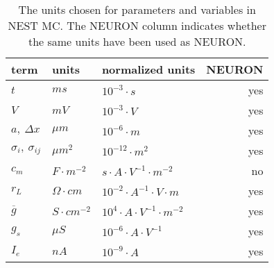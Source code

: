 \begin{table}[hp!]
\begin{tabular}{lllr}
    \hline
    term                      &   units                 &  normalized units                         & NEURON \\
    \hline
    $t$                       &   $ms$                  &  $10^{-3} \cdot s$                        & yes    \\
    $V$                       &   $mV$                  &  $10^{-3} \cdot V$                        & yes    \\
    $a,~\Delta x$             &   $\mu m$               &  $10^{-6} \cdot m$                        & yes    \\
    $\sigma_{i},~\sigma_{ij}$ &   $\mu m^2$             &  $10^{-12} \cdot m^2$                     & yes    \\
    $c_m$                     &   $F\cdot m^{-2}$       &  $s\cdot A\cdot V^{-1}\cdot m^{-2}$       & no     \\
    $r_L$                     &   $\Omega\cdot cm$      &  $10^{-2} \cdot A^{-1}\cdot V\cdot m$     & yes    \\
    $\overline{g}$            &   $S\cdot cm^{-2}$      &  $10^{4} \cdot A\cdot V^{-1}\cdot m^{-2}$ & yes    \\
    $g_s$                     &   $\mu S$               &  $10^{-6} \cdot A\cdot V^{-1}$            & yes    \\
    $I_e$                     &   $nA$                  &  $10^{-9} \cdot A$                        & yes    \\
    \hline
\end{tabular}
\caption{The units chosen for parameters and variables in NEST MC. The NEURON column indicates whether the same units have been used as NEURON.}
\label{tbl:units}
\end{table}

